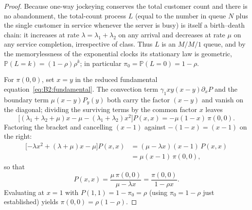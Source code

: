\begin{proof}
    Because one-way jockeying conserves the total customer count and there is no
    abandonment, the total-count process $L$ (equal to the number in queue $N$ plus the
    single customer in service whenever the server is busy) is itself a birth--death
    chain: it increases at rate $\lambda=\lambda_1+\lambda_2$ on any arrival and decreases
    at rate $\mu$ on any service completion, irrespective of class. Thus $L$ is an $M/M/1$
    queue, and by the memorylessness of the exponential clocks its stationary law is
    geometric, $\mathbb{P}(L=k)=(1-\rho)\rho^k$; in particular
    $\pi_0=\mathbb{P}(L=0)=1-\rho$.

    For $\pi(0,0)$, set $x=y$ in the reduced fundamental
    equation~\eqref{eq:B2:fundamental}. The convection term $\gamma_1 xy(x-y)\partial_x P$
    and the boundary term $\mu(x-y)P_y(y)$ both carry the factor $(x-y)$ and vanish on the
    diagonal; dividing the surviving terms by the common factor $x$ leaves
    \begin{equation}
        \bigl[(\lambda_1+\lambda_2+\mu)x - \mu - (\lambda_1+\lambda_2)x^2\bigr]P(x,x)
        = -\mu(1-x)\,\pi(0,0).
        \label{eq:B2:diagonal_ode}
    \end{equation}
    Factoring the bracket and cancelling $(x-1)$ against $-(1-x)=(x-1)$ on the right:
    \begin{align}
        \bigl[{-\lambda x^2} + (\lambda+\mu)x - \mu\bigr]P(x,x)
        &= (\mu-\lambda x)(x-1)\,P(x,x) \nonumber\\
        &= \mu(x-1)\,\pi(0,0),
        \label{eq:B2:diagonal_factored}
    \end{align}
    so that
    \begin{equation}
        P(x,x) = \frac{\mu\,\pi(0,0)}{\mu-\lambda x} = \frac{\pi(0,0)}{1-\rho x}.
        \label{eq:B2:Pxx}
    \end{equation}
    Evaluating at $x=1$ with $P(1,1)=1-\pi_0=\rho$ (using $\pi_0=1-\rho$ just established)
    yields $\pi(0,0)=\rho(1-\rho)$.
\end{proof}

